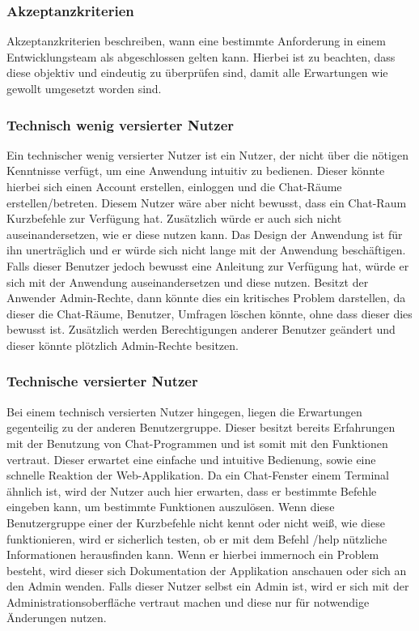 \subsubsection{Akzeptanzkriterien}
Akzeptanzkriterien beschreiben, wann eine bestimmte Anforderung in einem Entwicklungsteam als abgeschlossen gelten kann.
Hierbei ist zu beachten, dass diese objektiv und eindeutig zu überprüfen sind, damit alle Erwartungen wie gewollt umgesetzt worden sind. \autocite[vgl.][S. ]{noauthor_akzeptanzkriterien_nodate}

\subsubsection{Technisch wenig versierter Nutzer}
Ein technischer wenig versierter Nutzer ist ein Nutzer, der nicht über die nötigen Kenntnisse verfügt, um eine Anwendung intuitiv zu bedienen.
Dieser könnte hierbei sich einen Account erstellen, einloggen und die Chat-Räume erstellen/betreten.
Diesem Nutzer wäre aber nicht bewusst, dass ein Chat-Raum Kurzbefehle zur Verfügung hat.
Zusätzlich würde er auch sich nicht auseinandersetzen, wie er diese nutzen kann.
Das Design der Anwendung ist für ihn unerträglich und er würde sich nicht lange mit der Anwendung beschäftigen.
Falls dieser Benutzer jedoch bewusst eine Anleitung zur Verfügung hat, würde er sich mit der Anwendung auseinandersetzen und diese nutzen.
Besitzt der Anwender Admin-Rechte, dann könnte dies ein kritisches Problem darstellen, da dieser die Chat-Räume, Benutzer, Umfragen löschen könnte, ohne dass dieser dies bewusst ist.
Zusätzlich werden Berechtigungen anderer Benutzer geändert und dieser könnte plötzlich Admin-Rechte besitzen.

\subsubsection{Technische versierter Nutzer}
Bei einem technisch versierten Nutzer hingegen, liegen die Erwartungen gegenteilig zu der anderen Benutzergruppe.
Dieser besitzt bereits Erfahrungen mit der Benutzung von Chat-Programmen und ist somit mit den Funktionen vertraut.
Dieser erwartet eine einfache und intuitive Bedienung, sowie eine schnelle Reaktion der Web-Applikation.
Da ein Chat-Fenster einem Terminal ähnlich ist, wird der Nutzer auch hier erwarten, dass er bestimmte Befehle eingeben kann, um bestimmte Funktionen auszulösen.
Wenn diese Benutzergruppe einer der Kurzbefehle nicht kennt oder nicht weiß, wie diese funktionieren, wird er sicherlich testen, ob er mit dem Befehl /help nützliche Informationen herausfinden kann.
Wenn er hierbei immernoch ein Problem besteht, wird dieser sich Dokumentation der Applikation anschauen oder sich an den Admin wenden.
Falls dieser Nutzer selbst ein Admin ist, wird er sich mit der Administrationsoberfläche vertraut machen und diese nur für notwendige Änderungen nutzen.

